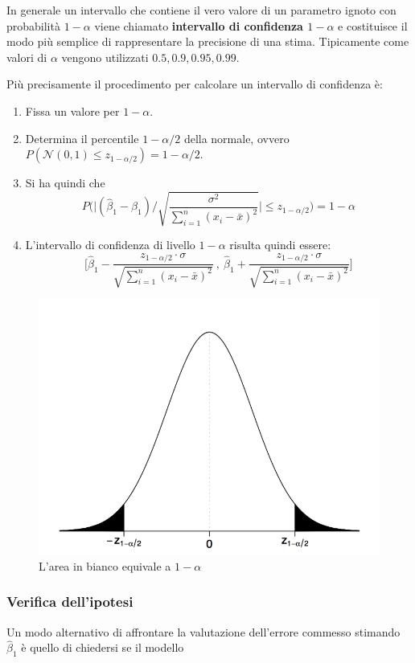 In generale un intervallo che contiene il vero valore di un parametro ignoto con probabilità $ 1 - \alpha $ viene chiamato \textbf{intervallo di confidenza $ 1 - \alpha $} e costituisce il modo più semplice di rappresentare la precisione di una stima. Tipicamente come valori di $ \alpha $ vengono utilizzati $ 0.5, 0.9, 0.95, 0.99 $.

Più precisamente il procedimento per calcolare un intervallo di confidenza è:

\begin{enumerate}
	\item Fissa un valore per $ 1-\alpha $.
	\item Determina il percentile $ 1 - \alpha/2 $ della normale, ovvero $ P(\mathcal{N}(0,1) \leq z_{1 - \alpha/2}) = 1 - \alpha/2 $.
	\item Si ha quindi che 
	$$
	P\Bigg( \Bigg| (\hat{\beta}_1 - \beta_1) \Bigg/ \sqrt{\frac{\sigma^2}{\sum_{i=1}^n (x_i - \bar{x})^2}}\Bigg| \leq z_{1 - \alpha/2}\Bigg) = 1 - \alpha
	$$
	\item L'intervallo di confidenza di livello $ 1 - \alpha $ risulta quindi essere:
	$$
	\Bigg[ \hat{\beta}_1 - \frac{z_{1-\alpha/2} \cdot \sigma}{\sqrt{\sum_{i=1}^n (x_i - \bar{x})^2}} \: , \: \hat{\beta}_1 + \frac{z_{1-\alpha/2} \cdot \sigma}{\sqrt{\sum_{i=1}^n (x_i - \bar{x})^2}}\Bigg]
	$$
\end{enumerate}

\begin{figure}[htbp]
\centering
\includegraphics[width = .5\textwidth]{./notes/immagini/l5-fig1-1.png}
\caption{L'area in bianco equivale a $ 1 - \alpha $}
\end{figure}

\subsubsection{Verifica dell'ipotesi}

Un modo alternativo di affrontare la valutazione dell'errore commesso stimando $ \hat{\beta}_1 $ è quello di chiedersi se il modello

